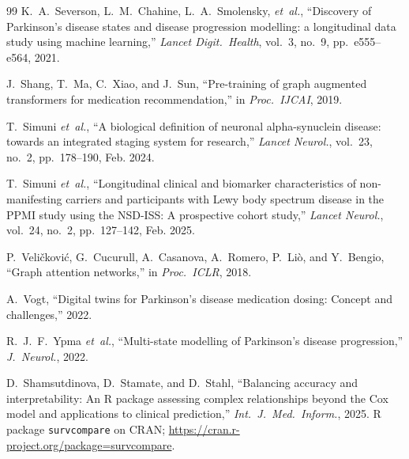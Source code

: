 \begin{thebibliography}{99}
K.~A.~Severson, L.~M.~Chahine, L.~A.~Smolensky, \textit{et~al.}, ``Discovery of Parkinson's disease states and disease progression modelling: a longitudinal data study using machine learning,'' \textit{Lancet Digit.\ Health}, vol.~3, no.~9, pp.~e555--e564, 2021.

J.~Shang, T.~Ma, C.~Xiao, and J.~Sun, ``Pre-training of graph augmented transformers for medication recommendation,'' in \textit{Proc.\ IJCAI}, 2019.

T.~Simuni \textit{et~al.}, ``A biological definition of neuronal alpha-synuclein disease: towards an integrated staging system for research,'' \textit{Lancet Neurol.}, vol.~23, no.~2, pp.~178--190, Feb. 2024.

T.~Simuni \textit{et~al.}, ``Longitudinal clinical and biomarker characteristics of non-manifesting carriers and participants with Lewy body spectrum disease in the PPMI study using the NSD-ISS: A prospective cohort study,'' \textit{Lancet Neurol.}, vol.~24, no.~2, pp.~127--142, Feb. 2025.

P.~Veli\v{c}kovi\'{c}, G.~Cucurull, A.~Casanova, A.~Romero, P.~Li\`{o}, and Y.~Bengio, ``Graph attention networks,'' in \textit{Proc.\ ICLR}, 2018.

A.~Vogt, ``Digital twins for Parkinson's disease medication dosing: Concept and challenges,'' 2022.

R.~J.~F.~Ypma \textit{et~al.}, ``Multi-state modelling of Parkinson's disease progression,'' \textit{J.\ Neurol.}, 2022.


D.~Shamsutdinova, D.~Stamate, and D.~Stahl, ``Balancing accuracy and interpretability: An R package assessing complex relationships beyond the Cox model and applications to clinical prediction,'' \textit{Int.\ J.\ Med.\ Inform.}, 2025. R package \texttt{survcompare} on CRAN; \url{https://cran.r-project.org/package=survcompare}.

\end{thebibliography}
